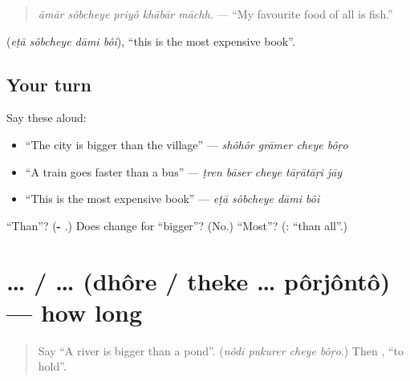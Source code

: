 \begin{quote}
\textbf{    }
\end{quote}

\begin{quote}
\emph{āmār sôbcheye priyô khābār māchh.} — \textquotedblleft{}My favourite food of all is fish.\textquotedblright{}
\end{quote}

\textbf{   } (\emph{eṭā sôbcheye dāmi bôi}), \textquotedblleft{}this is the most expensive book\textquotedblright{}.

\subsection*{Your turn}
Say these aloud:

\begin{itemize}
\raggedright
  \item \textquotedblleft{}The city is bigger than the village\textquotedblright{} — \emph{shôhôr grāmer cheye bôṛo}
  \item \textquotedblleft{}A train goes faster than a bus\textquotedblright{} — \emph{ṭren bāser cheye tāṛātāṛi jāy}
  \item \textquotedblleft{}This is the most expensive book\textquotedblright{} — \emph{eṭā sôbcheye dāmi bôi}
\end{itemize}

\begin{tcolorbox}[breakable,colback=teal!4,colframe=teal!35!black,title={Before you move on}]
\textquotedblleft{}Than\textquotedblright{}? (\textbf{- }.) Does \textbf{} change for \textquotedblleft{}bigger\textquotedblright{}? (No.) \textquotedblleft{}Most\textquotedblright{}? (\textbf{}: \textquotedblleft{}than all\textquotedblright{}.)
\end{tcolorbox}
\section[\texorpdfstring{… \bn{ধরে} / \bn{থেকে} … … (… dhôre / theke …)}{… ধরে / থেকে … … (… dhôre / theke …)}]{…  /  …  (dhôre / theke … pôrjôntô) — how long}

\label{lesson:BN-C273-dhore}



\begin{quote}
Say \textquotedblleft{}A river is bigger than a pond\textquotedblright{}. (\emph{nôdī pukurer cheye bôṛo}.) Then \textbf{}, \textquotedblleft{}to hold\textquotedblright{}.
\end{quote}

